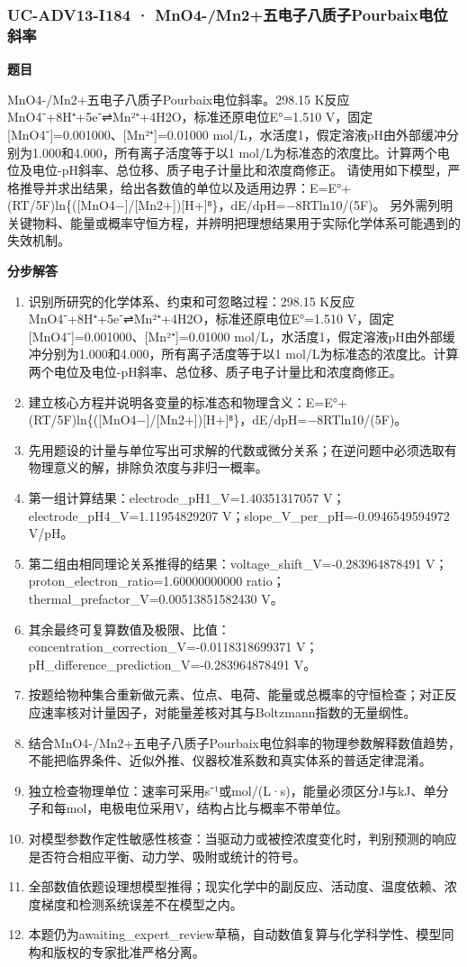 \documentclass[UTF8,11pt,a4paper]{ctexart}
\begin{document}
\subsubsection*{UC-ADV13-I184 · MnO4-/Mn2+五电子八质子Pourbaix电位斜率}
\noindent\textbf{题目}\par
MnO4-/Mn2+五电子八质子Pourbaix电位斜率。298.15 K反应MnO4⁻+8H⁺+5e⁻⇌Mn²⁺+4H2O，标准还原电位E°=1.510 V，固定[MnO4⁻]=0.001000、[Mn²⁺]=0.01000 mol/L，水活度1，假定溶液pH由外部缓冲分别为1.000和4.000，所有离子活度等于以1 mol/L为标准态的浓度比。计算两个电位及电位-pH斜率、总位移、质子电子计量比和浓度商修正。 请使用如下模型，严格推导并求出结果，给出各数值的单位以及适用边界：E=E°+(RT/5F)ln\{([MnO4−]/[Mn2+])[H+]⁸\}，dE/dpH=−8RTln10/(5F)。 另外需列明关键物料、能量或概率守恒方程，并辨明把理想结果用于实际化学体系可能遇到的失效机制。\par
\medskip\noindent\textbf{分步解答}
\begin{enumerate}
\item 识别所研究的化学体系、约束和可忽略过程：298.15 K反应MnO4⁻+8H⁺+5e⁻⇌Mn²⁺+4H2O，标准还原电位E°=1.510 V，固定[MnO4⁻]=0.001000、[Mn²⁺]=0.01000 mol/L，水活度1，假定溶液pH由外部缓冲分别为1.000和4.000，所有离子活度等于以1 mol/L为标准态的浓度比。计算两个电位及电位-pH斜率、总位移、质子电子计量比和浓度商修正。
\item 建立核心方程并说明各变量的标准态和物理含义：E=E°+(RT/5F)ln\{([MnO4−]/[Mn2+])[H+]⁸\}，dE/dpH=−8RTln10/(5F)。
\item 先用题设的计量与单位写出可求解的代数或微分关系；在逆问题中必须选取有物理意义的解，排除负浓度与非归一概率。
\item 第一组计算结果：electrode\_pH1\_V=1.40351317057 V；electrode\_pH4\_V=1.11954829207 V；slope\_V\_per\_pH=-0.0946549594972 V/pH。
\item 第二组由相同理论关系推得的结果：voltage\_shift\_V=-0.283964878491 V；proton\_electron\_ratio=1.60000000000 ratio；thermal\_prefactor\_V=0.00513851582430 V。
\item 其余最终可复算数值及极限、比值：concentration\_correction\_V=-0.0118318699371 V；pH\_difference\_prediction\_V=-0.283964878491 V。
\item 按题给物种集合重新做元素、位点、电荷、能量或总概率的守恒检查；对正反应速率核对计量因子，对能量差核对其与Boltzmann指数的无量纲性。
\item 结合MnO4-/Mn2+五电子八质子Pourbaix电位斜率的物理参数解释数值趋势，不能把临界条件、近似外推、仪器校准系数和真实体系的普适定律混淆。
\item 独立检查物理单位：速率可采用s⁻¹或mol/(L·s)，能量必须区分J与kJ、单分子和每mol，电极电位采用V，结构占比与概率不带单位。
\item 对模型参数作定性敏感性核查：当驱动力或被控浓度变化时，判别预测的响应是否符合相应平衡、动力学、吸附或统计的符号。
\item 全部数值依题设理想模型推得；现实化学中的副反应、活动度、温度依赖、浓度梯度和检测系统误差不在模型之内。
\item 本题仍为awaiting\_expert\_review草稿，自动数值复算与化学科学性、模型同构和版权的专家批准严格分离。
\end{enumerate}
\end{document}
